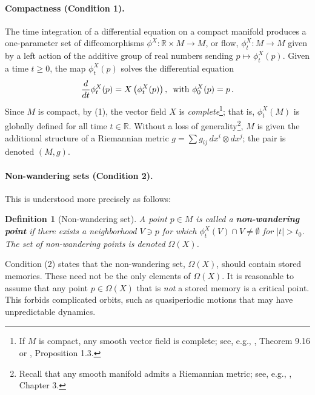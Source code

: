 \documentclass[12pt]{article}
\newtheorem{definition}[theorem]{Definition}
\begin{document}
\paragraph{Compactness (Condition 1).}
The time integration of a differential equation on a compact manifold produces a one-parameter set of diffeomorphisms $\phi^X: \mathbb{R} \times M \rightarrow M$, or flow, $\phi_t^X: M \rightarrow M$ given by a left action of the additive group of real numbers sending $p \mapsto \phi_t^X(p)$. Given a time $t \geq 0$, the map $\phi^X_t(p)$ solves the differential equation
\begin{equation}
\label{equation:vector-field-ode-definition}
    \frac{d}{dt}\phi^X_t(p) = X\left(\phi^X_t(p) \right), \hspace{0.5em}  \text{with }\phi^X_0(p)=p \,.
\end{equation}
Since $M$ is compact, by (1), the vector field $X$ is \textit{complete}\footnote{If $M$ is compact, any smooth vector field is complete; see, e.g., \cite{lee2013smooth}, Theorem 9.16 or \cite{palis2012geometric}, Proposition 1.3.}; that is, $\phi^X_t(M)$ is globally defined for all time $t\in \mathbb{R}$. Without a loss of generality\footnote{Recall that any smooth manifold admits a Riemannian metric; see, e.g., \cite{lee2006riemannian}, Chapter 3.}, $M$ is given the additional structure of a Riemannian metric $g = \sum g_{ij} \, dx^i \otimes dx^j$; the pair is denoted $(M,g)$. 



\paragraph{Non-wandering sets (Condition 2).}
This is understood more precisely as follows:

\begin{definition}[Non-wandering set]
    A point $p \in M$ is called a \textbf{\textit{non-wandering point}} if there exists a neighborhood $V \ni p$ for which $\phi_t^X(V) \cap V \neq \emptyset$ for $|t|> t_0$. The set of non-wandering points is denoted $\Omega(X)$.
\end{definition}

Condition (2) states that the non-wandering set, $\Omega(X)$, should contain stored memories. These need not be the only elements of $\Omega(X)$. It is reasonable to assume that any point $p \in \Omega(X)$ that is \textit{not} a stored memory is a critical point. This forbids complicated orbits, such as quasiperiodic motions that may have unpredictable dynamics.
\end{document}
